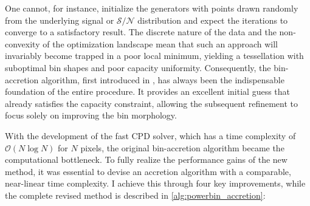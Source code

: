 \documentclass[fleqn,usenatbib]{mnras}
\newcommand{\sn}{\mathcal{S/N}}
\begin{document}
One cannot, for instance, initialize the generators with points drawn randomly from the underlying signal or $\sn$ distribution and expect the iterations to converge to a satisfactory result. The discrete nature of the data and the non-convexity of the optimization landscape mean that such an approach will invariably become trapped in a poor local minimum, yielding a tessellation with suboptimal bin shapes and poor capacity uniformity. Consequently, the bin-accretion algorithm, first introduced in \citet[sec.~4.2]{Cappellari2003}, has always been the indispensable foundation of the entire procedure. It provides an excellent initial guess that already satisfies the capacity constraint, allowing the subsequent refinement to focus solely on improving the bin morphology.

With the development of the fast CPD solver, which has a time complexity of $\mathcal{O}(N\log N)$ for $N$ pixels, the original bin-accretion algorithm became the computational bottleneck. To fully realize the performance gains of the new method, it was essential to devise an accretion algorithm with a comparable, near-linear time complexity. I achieve this through four key improvements, while the complete revised method is described in \autoref{alg:powerbin_accretion}:
\end{document}
